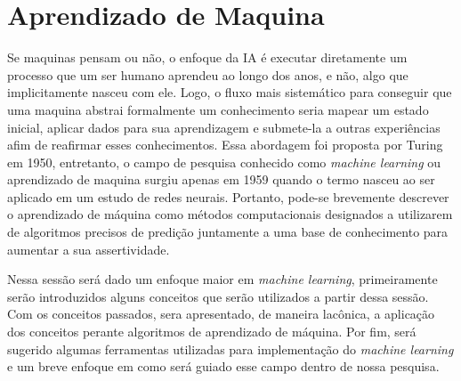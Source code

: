 \section{Aprendizado de Maquina}
Se maquinas pensam ou não, o enfoque da IA é executar diretamente um processo que um ser humano aprendeu ao longo dos anos, e não, algo que implicitamente nasceu com ele. Logo, o fluxo mais sistemático para conseguir que uma maquina abstrai formalmente um conhecimento seria mapear um estado inicial, aplicar dados para sua aprendizagem e submete-la a outras experiências afim de reafirmar esses conhecimentos. Essa abordagem foi proposta por Turing em 1950, entretanto, o campo de pesquisa conhecido como \textit{machine learning} ou aprendizado de maquina surgiu apenas em 1959 quando o termo nasceu ao ser aplicado em um estudo de redes neurais. Portanto, pode-se brevemente descrever o aprendizado de máquina como métodos computacionais designados a utilizarem de algoritmos precisos de predição juntamente a uma base de conhecimento para aumentar a sua assertividade\cite[1]{turing1950, samuel1959some, mohri2012foundations}.

Nessa sessão será dado um enfoque maior em \textit{machine learning}, primeiramente serão introduzidos alguns conceitos que serão utilizados a partir dessa sessão. Com os conceitos passados, sera apresentado, de maneira lacônica, a aplicação dos conceitos perante algoritmos de aprendizado de máquina. Por fim, será sugerido algumas ferramentas utilizadas para implementação do \textit{machine learning} e um breve enfoque em como será guiado esse campo dentro de nossa pesquisa.



